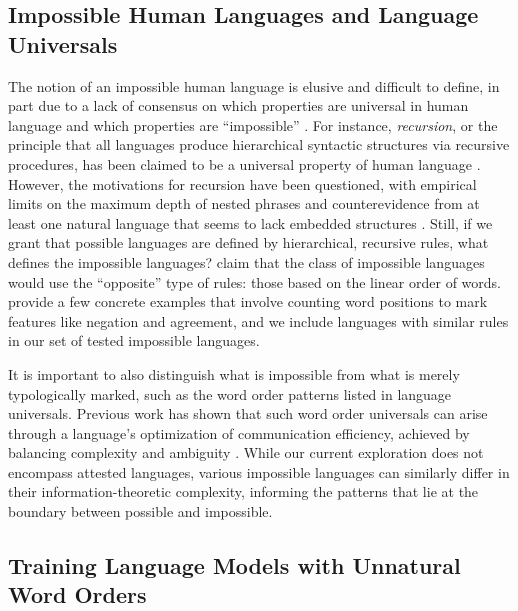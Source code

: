 \documentclass[11pt]{article}
\begin{document}
\subsection{Impossible Human Languages and Language Universals}


The notion of an impossible human language is elusive and difficult to define, in part due to a lack of consensus on which properties are universal in human language and which properties are ``impossible'' \citep{comrie1989language, evans2009myth, Nefdt_2024}.
For instance, \emph{recursion}, or the principle that all languages produce hierarchical syntactic structures via recursive procedures, has been claimed to be a universal property of human language \citep{chomsky1957syntactic, chomsky1965aspects, chomsky2002nature, hauser2002faculty}.
However, the motivations for recursion have been questioned, with empirical limits on the maximum depth of nested phrases \cite{karlsson2007constraints, jin-etal-2018-depth} and counterevidence from at least one natural language that seems to lack embedded structures \cite{everett2012piraha}. Still, if we grant that possible languages are defined by hierarchical, recursive rules, what defines the impossible languages? \citet{moro2023impossible} claim that the class of impossible languages would use the ``opposite'' type of rules: those based on the linear order of words. \citet{musso2003broca} provide a few concrete examples that involve counting word positions to mark features like negation and agreement, and we include languages with similar rules in our set of tested impossible languages.

It is important to also distinguish what is impossible from what is merely typologically marked, such as the word order patterns listed in   language universals. Previous work has shown that such word order universals can arise through a language's optimization of communication efficiency, achieved by balancing complexity and ambiguity \cite{hahnetal2020universals, futrell2022information}.
While our current exploration does not encompass attested languages, various impossible languages can similarly differ in their information-theoretic complexity, informing the patterns that lie at the boundary between possible and impossible.




\subsection{Training Language Models with Unnatural Word Orders}
\end{document}
